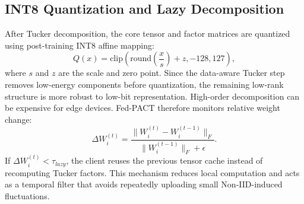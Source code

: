 \documentclass[conference]{IEEEtran}
\begin{document}
\subsection{INT8 Quantization and Lazy Decomposition}
After Tucker decomposition, the core tensor and factor matrices are quantized using post-training INT8 affine mapping:
\begin{equation}
    Q(x)=\mathrm{clip}\left(
    \mathrm{round}\left(\frac{x}{s}\right)+z,-128,127
    \right),
    \label{eq:int8}
\end{equation}
where $s$ and $z$ are the scale and zero point. Since the data-aware Tucker step removes low-energy components before quantization, the remaining low-rank structure is more robust to low-bit representation.
High-order decomposition can be expensive for edge devices. Fed-PACT therefore monitors relative weight change:
\begin{equation}
    \Delta W_i^{(t)}=\frac{\|W_i^{(t)}-W_i^{(t-1)}\|_F}
    {\|W_i^{(t-1)}\|_F+\epsilon}.
    \label{eq:lazy}
\end{equation}
If $\Delta W_i^{(t)}<\tau_{lazy}$, the client reuses the previous tensor cache instead of recomputing Tucker factors. This mechanism reduces local computation and acts as a temporal filter that avoids repeatedly uploading small Non-IID-induced fluctuations.
\end{document}
